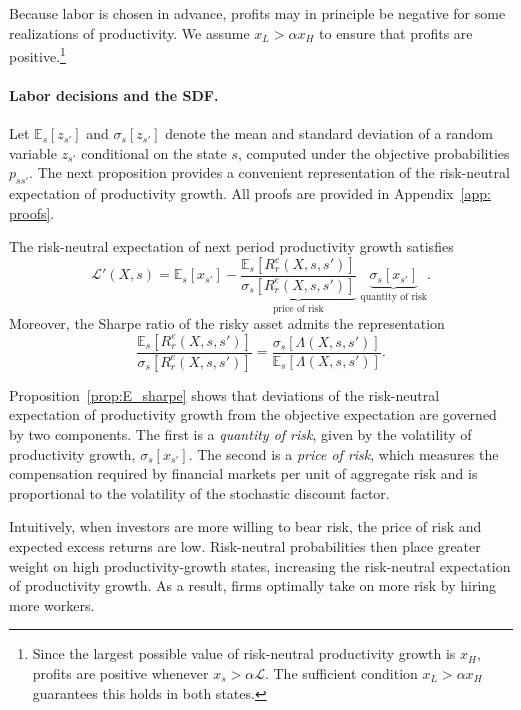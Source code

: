 Because labor is chosen in advance, profits may in principle be negative for some
realizations of productivity. We assume $x_L>\alpha x_H$ to ensure that profits are
positive.\footnote{Since the largest possible value of risk-neutral
productivity growth is $x_H$, profits are positive whenever $x_s>\alpha\mathcal L$.
The sufficient condition $x_L>\alpha x_H$ guarantees this holds in both states.}

\paragraph{Labor decisions and the SDF.}

Let $\mathbb E_s[z_{s'}]$ and $\sigma_s[z_{s'}]$ denote the mean and standard deviation of
a random variable $z_{s'}$ conditional on the state $s$, computed under the
objective probabilities $p_{ss'}$. The next proposition provides a convenient
representation of the risk-neutral expectation of productivity growth. All proofs are
provided in Appendix~\ref{app: proofs}.

\begin{proposition}\label{prop:E_sharpe}
The risk-neutral expectation of next period productivity growth satisfies
\begin{equation}
\mathcal L'(X,s)
=
\mathbb E_s[x_{s'}]
-
\underbrace{
\frac{\mathbb E_s\!\left[R_r^e(X,s,s')\right]}
{\sigma_s\!\left[R_r^e(X,s,s')\right]}
}_{\text{price of risk}}
\;
\underbrace{
\sigma_s[x_{s'}]
}_{\text{quantity of risk}}.
\label{eq:E_prime}
\end{equation}
Moreover, the Sharpe ratio of the risky asset admits the representation
\[
\frac{\mathbb E_s\!\left[R_r^e(X,s,s')\right]}
{\sigma_s\!\left[R_r^e(X,s,s')\right]}
=
\frac{\sigma_s\!\left[\Lambda(X,s,s')\right]}
{\mathbb E_s\!\left[\Lambda(X,s,s')\right]}.
\]
\end{proposition}

Proposition~\ref{prop:E_sharpe} shows that deviations of the risk-neutral expectation
of productivity growth from the objective expectation are governed by two components. The first is a \emph{quantity of
risk}, given by the volatility of productivity growth, $\sigma_s[x_{s'}]$. The second is
a \emph{price of risk}, which measures the compensation required by financial markets per
unit of aggregate risk and is proportional to the volatility of the stochastic discount
factor.

Intuitively, when investors are more willing to bear risk, the price of risk and expected
excess returns are low. Risk-neutral probabilities then place greater weight on high
productivity-growth states, increasing the risk-neutral expectation of productivity
growth. As a result, firms optimally take on more risk by hiring more workers.


